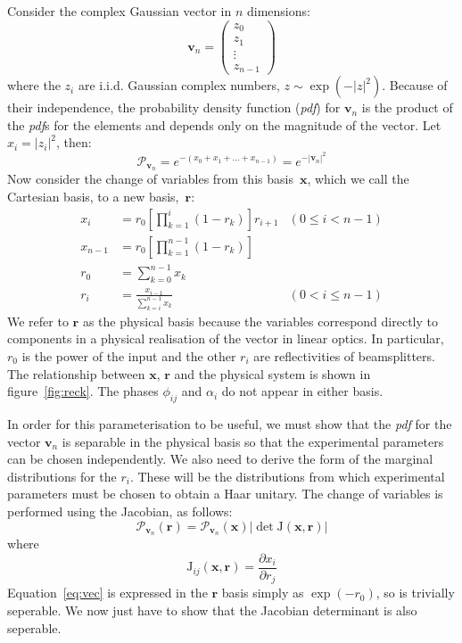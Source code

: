 \documentclass[aps,prl,twocolumn]{revtex4}
\renewcommand{\vec}[1]{\mathbf{#1}}
\newcommand{\mat}[1]{\mathrm{#1}}
\newcommand{\of}[1]{\!\left(#1\right)}
\newcommand{\pdf}{{\it pdf}}
\newcommand{\abs}[1]{\left|#1\right|}
\newcommand{\prob}[1]{\mathcal{#1}}
\begin{document}
Consider the complex Gaussian vector in \(n\) dimensions:
\begin{equation}
  \vec{v}_n = \begin{pmatrix}
    z_0 \\
    z_1 \\
    \vdots \\
    z_{n-1}
  \end{pmatrix}
\end{equation}
where the \(z_i\) are i.i.d. Gaussian complex numbers, \( z \sim \exp \left(
-\abs{z}^2 \right) \). Because of their independence, the probability
density function (\pdf) for \(\vec{v}_n\) is the product of the \pdf s for the
elements and depends only on the magnitude of the vector. Let \(x_i
= \abs{z_i}^2 \), then:
\begin{equation}
  \label{eq:vec}
  \prob{P}_{\vec{v}_n} = e^{ -\left(x_0 + x_1 + \dots + x_{n-1} \right)} = e^{
  -\abs{\vec{v}_n}^2}
\end{equation}
Now consider the change of variables from this basis~\(\vec{x}\), which we call
the Cartesian basis, to a new basis,~\(\vec{r}\):
\begin{align}
  x_i &= r_0 \left[ \prod_{k=1}^{i} \left( 1-r_k \right) \right] r_{i+1} &
    \left( 0 \leq i < n-1 \right) \\
  x_{n-1} &= r_0 \left[ \prod_{k=1}^{n-1} \left( 1-r_k \right) \right] \\
  r_0 &= \sum_{k=0}^{n-1} x_k \\
  r_i &= \frac{x_{i-1}}{\sum_{k=i}^{n-1} x_k} & \left( 0 < i \leq n-1 \right)
\end{align}
We refer to \(\vec{r}\) as the physical basis because the variables
correspond directly to components in a physical realisation of the vector in
linear optics. In particular, \(r_0\) is the power of the input and the other
\(r_i\) are reflectivities of beamsplitters. The relationship between
\(\vec{x}\), \(\vec{r}\) and the physical system is shown in
figure~\ref{fig:reck}. The phases \(\phi_{ij}\) and \(\alpha_i\) do
not appear in either basis.

In order for this parameterisation to be useful, we must show that the \pdf{ }
for the vector \(\vec{v}_n\) is separable in the physical basis so that the
experimental parameters can be chosen independently. We also need to derive the
form of the marginal distributions for the \(r_i\). These will be the
distributions from which experimental parameters must be chosen to obtain a Haar
unitary. The change of variables is performed using the Jacobian, as follows:
\begin{equation}
  \prob{P}_{\vec{v}_n} \of{\vec{r}} = \prob{P}_{\vec{v}_n} \of{\vec{x}}
  \abs{\det \mat{J} \of{\vec{x}, \vec{r}}}
\end{equation}
where
\begin{equation}
  \mat{J}_{ij} \of{\vec{x}, \vec{r}} = \frac{\partial x_{i}}{\partial r_j}
\end{equation}
Equation~\ref{eq:vec} is expressed in the \(\vec{r}\) basis simply as \(\exp
\of{-r_0}\), so is trivially seperable. We now just have to show that the
Jacobian determinant is also seperable.
\end{document}
